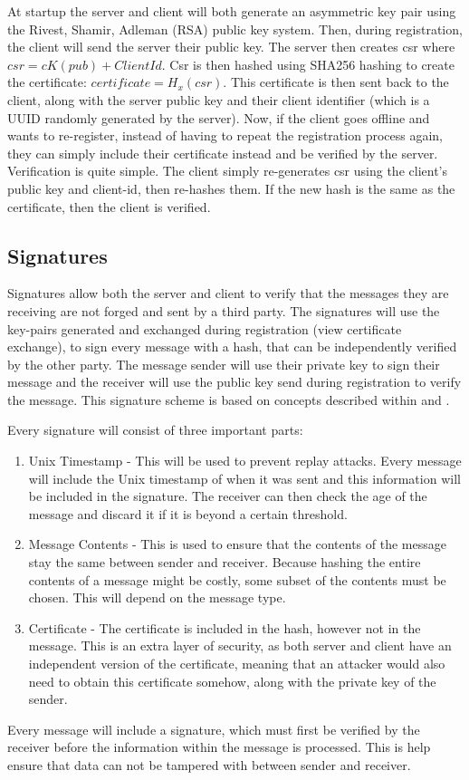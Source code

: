 At startup the server and client will both generate an asymmetric key pair using the Rivest, Shamir, Adleman (RSA) public key system. Then, during registration, the client will send the server their public key. The server then creates csr where \(csr = cK(pub) + ClientId\). Csr is then hashed using SHA256 hashing to create the certificate: \(certificate = H_x(csr)\). This certificate is then sent back to the client, along with the server public key and their client identifier (which is a UUID randomly generated by the server). Now, if the client goes offline and wants to re-register, instead of having to repeat the registration process again, they can simply include their certificate instead and be verified by the server. Verification is quite simple. The client simply re-generates csr using the client's public key and client-id, then re-hashes them. If the new hash is the same as the certificate, then the client is verified.

\subsection{Signatures}
Signatures allow both the server and client to verify that the messages they are receiving are not forged and sent by a third party. The signatures will use the key-pairs generated and exchanged during registration (view certificate exchange), to sign every message with a hash, that can be independently verified by the other party. The message sender will use their private key to sign their message and the receiver will use the public key send during registration to verify the message. This signature scheme is based on concepts described within \cite{disSysConceptsDesign} and \cite{disSysPrinciples}.

Every signature will consist of three important parts:
\begin{enumerate}
    \item Unix Timestamp - This will be used to prevent replay attacks. Every message will include the Unix timestamp of when it was sent and this information will be included in the signature. The receiver can then check the age of the message and discard it if it is beyond a certain threshold.
    \item Message Contents - This is used to ensure that the contents of the message stay the same between sender and receiver. Because hashing the entire contents of a message might be costly, some subset of the contents must be chosen. This will depend on the message type.
    \item Certificate - The certificate is included in the hash, however not in the message. This is an extra layer of security, as both server and client have an independent version of the certificate, meaning that an attacker would also need to obtain this certificate somehow, along with the private key of the sender.
\end{enumerate}

Every message will include a signature, which must first be verified by the receiver before the information within the message is processed. This is help ensure that data can not be tampered with between sender and receiver.
